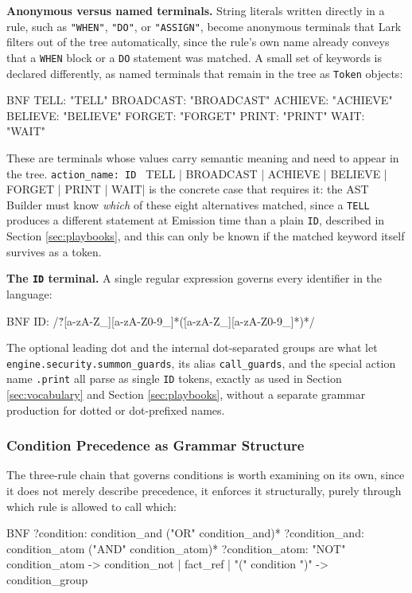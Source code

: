 \textbf{Anonymous versus named terminals.} String literals written directly in a rule, such as \lstinline|"WHEN"|, \lstinline|"DO"|, or \lstinline|"ASSIGN"|, become anonymous terminals that Lark filters out of the tree automatically, since the rule's own name already conveys that a \lstinline|WHEN| block or a \lstinline|DO| statement was matched. A small set of keywords is declared differently, as named terminals that remain in the tree as \lstinline|Token| objects:
\begin{codeblock}[]{BNF}
TELL: "TELL"
BROADCAST: "BROADCAST"
ACHIEVE: "ACHIEVE"
BELIEVE: "BELIEVE"
FORGET: "FORGET"
PRINT: "PRINT"
WAIT: "WAIT"
\end{codeblock}
These are terminals whose values carry semantic meaning and need to appear in the tree. \lstinline|action_name: ID | TELL | BROADCAST | ACHIEVE | BELIEVE | FORGET | PRINT | WAIT| is the concrete case that requires it: the AST Builder must know \emph{which} of these eight alternatives matched, since a \lstinline|TELL| produces a different statement at Emission time than a plain \lstinline|ID|, described in Section \ref{sec:playbooks}, and this can only be known if the matched keyword itself survives as a token.

\textbf{The \lstinline|ID| terminal.} A single regular expression governs every identifier in the language:

\begin{codeblock}[]{BNF}
ID: /\.?[a-zA-Z_][a-zA-Z0-9_]*(\.[a-zA-Z_][a-zA-Z0-9_]*)*/
\end{codeblock}

The optional leading dot and the internal dot-separated groups are what let \lstinline|engine.security.summon_guards|, its alias \lstinline|call_guards|, and the special action name \lstinline|.print| all parse as single \lstinline|ID| tokens, exactly as used in Section \ref{sec:vocabulary} and Section \ref{sec:playbooks}, without a separate grammar production for dotted or dot-prefixed names.

\subsubsection{Condition Precedence as Grammar Structure}
\label{sec:condition-precedence}
The three-rule chain that governs conditions is worth examining on its own, since it does not merely describe precedence, it enforces it structurally, purely through which rule is allowed to call which:

\begin{codeblock}[]{BNF}
?condition:       condition_and ("OR" condition_and)*
?condition_and:   condition_atom ("AND" condition_atom)*
?condition_atom: "NOT" condition_atom -> condition_not
               | fact_ref
               | "(" condition ")" -> condition_group
\end{codeblock}

